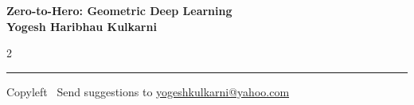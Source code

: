 \documentclass[8pt,landscape]{article}
\begin{document}
\footnotesize


\begin{center}
\Large{\textbf{Zero-to-Hero: Geometric Deep Learning\\ Yogesh Haribhau Kulkarni}}  
\end{center}

\begin{multicols}{2}

\end{multicols}

\rule{\linewidth}{0.25pt}
\scriptsize
Copyleft \textcopyleft\  Send suggestions to 
\href{http://www.yogeshkulkarni.com}{yogeshkulkarni@yahoo.com}
\end{document}
